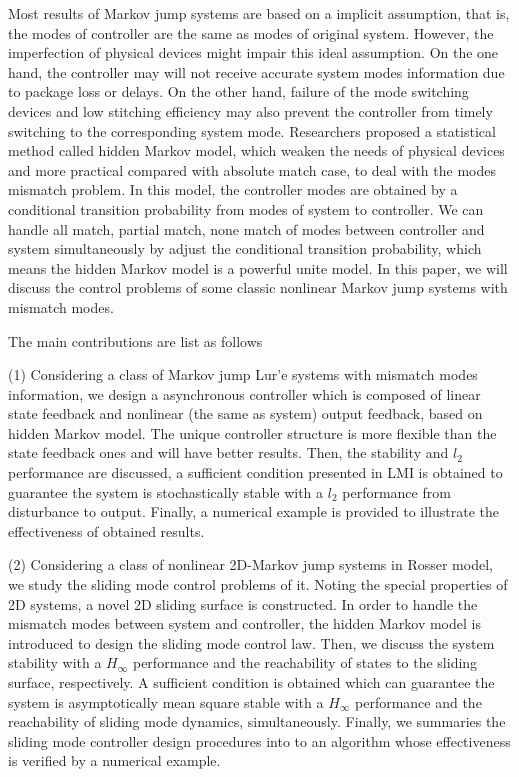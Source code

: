 

\begin{eabstract}
Most results of Markov jump systems are based on a implicit assumption, that is, the modes of controller are the same as modes of original system. However, the imperfection of  physical devices might impair this ideal assumption. On the one hand, the controller may will not receive accurate system modes information due to package loss or delays. On the other hand, failure of the mode switching devices and low stitching efficiency may also prevent the controller from  timely switching to the corresponding system mode. Researchers proposed a  statistical method called hidden Markov model, which weaken the needs of physical devices and more practical compared with absolute match case, to deal with the modes mismatch problem. In this model, the controller modes are obtained by a conditional transition probability from modes of system to controller. We can handle all match, partial match, none match of modes between controller and system simultaneously by adjust the conditional transition probability, which means the hidden Markov model is a powerful unite model. In this paper, we will discuss the control problems of some classic nonlinear Markov jump systems with mismatch modes.

The main contributions are list as follows

(1) Considering a class of Markov jump Lur'e systems with mismatch modes information,  we design a asynchronous controller which is composed of  linear state feedback and  nonlinear (the same as system) output feedback, based on hidden Markov model.  The unique controller structure is more flexible  than the  state feedback ones and will have better results. Then, the stability and $l_2$ performance are discussed, a sufficient condition presented in LMI is obtained to guarantee the system is stochastically stable with a $l_2$ performance from disturbance to output. Finally, a numerical example is provided to illustrate the effectiveness of obtained results.

(2) Considering a class of nonlinear 2D-Markov jump systems in Rosser model, we study the sliding mode control problems of it. Noting the special properties of 2D systems, a novel 2D sliding surface is constructed. In order to handle the mismatch modes between system and controller, the hidden Markov model is introduced to design the sliding mode control law. Then, we discuss the system stability with a  $H_\infty$ performance and the reachability of states to the sliding surface, respectively. A sufficient condition is obtained which can guarantee the system is  asymptotically mean square stable with a $H_\infty$  performance and the reachability of sliding mode dynamics, simultaneously. Finally, we summaries  the sliding mode controller design procedures into to an algorithm whose effectiveness is verified by a numerical example. 



\end{eabstract}
